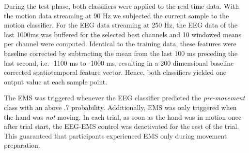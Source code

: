 During the test phase, both classifiers were applied to the real-time data. With the motion data streaming at 90 Hz we subjected the current sample to the motion classifier. For the EEG data streaming at 250 Hz, the EEG data of the last 1000ms was buffered for the selected best channels and 10 windowed means per channel were computed. Identical to the training data, these features were baseline corrected by subtracting the mean from the last 100 ms preceding the last second, i.e. -1100 ms to -1000 ms, resulting in a 200 dimensional baseline corrected spatiotemporal feature vector. Hence, both classifiers yielded one output value at each sample point.

The EMS was triggered whenever the EEG classifier predicted the \textit{pre-movement} class with an above .7 probability. Additionally, EMS was only triggered when the hand was \textit{not} moving. In each trial, as soon as the hand was in motion once after trial start, the EEG-EMS control was deactivated for the rest of the trial. This guaranteed that participants experienced EMS only during movement preparation.